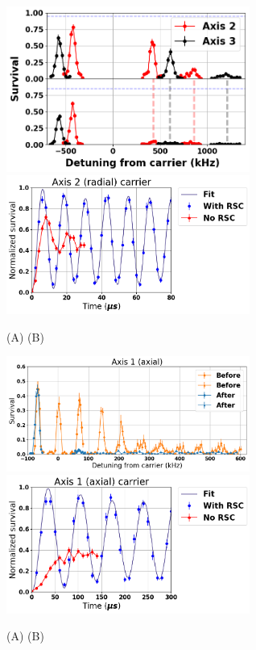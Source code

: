 \documentclass[aps,prl,twocolumn,groupedaddress]{revtex4-1}
\begin{document}
\begin{figure}
  \includegraphics[width=8cm]{imgs/spectrum_r.png}
  \includegraphics[width=8cm]{imgs/temp/fit_20170409_r2_0_ba.png}
  \caption{(A) (B) \label{f-radial}}
\end{figure}
\begin{figure}
  \includegraphics[width=8cm]{imgs/spectrum_a1.png}
  \includegraphics[width=8cm]{imgs/temp/fit_20170409_a1_0_ba.png}
  \caption{(A) (B) \label{f-axial}}
\end{figure}


\end{document}
